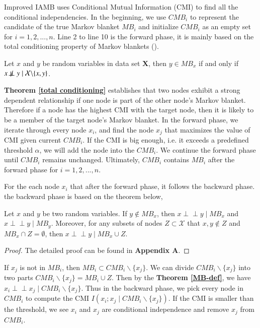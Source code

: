 \documentclass[twoside,11pt]{article}
\begin{document}
Improved IAMB uses Conditional Mutual Information (CMI) to find all the conditional independencies. In the beginning, we use $CMB_i$ to represent the candidate of the true Markov blanket $MB_i$ and initialize $CMB_i$ as an empty set for $i=1, 2, ..., n$. Line 2 to line 10 is the forward phase, it is mainly based on the total conditioning property of Markov blankets (\cite{pellet2008using}). 
\begin{theorem}
\label{total conditioning}
Let $x$ and $y$ be random variables in data set $\mathbf X$, then $y\in MB_x$ if and only if $x \not\! \perp \!\!\! \perp y\mid \mathcal X\backslash\{x,y\}$.
\end{theorem}
\textbf{Theorem \ref{total conditioning}} establishes that two nodes exhibit a strong dependent relationship if one node is part of the other node's Markov blanket. Therefore if a node has the highest CMI with the target node, then it is likely to be a member of the target node's Markov blanket. In the forward phase, we iterate through every node $x_i$, and find the node $x_j$ that maximizes the value of CMI given current $CMB_i$. If the CMI is big enough, i.e. it exceeds a predefined threshold $\alpha$, we will add the node into the $CMB_i$. We continue the forward phase until $CMB_i$ remains unchanged. Ultimately, $CMB_i$ contains $MB_i$ after the forward phase for $i=1, 2, ..., n$.

For the each node $x_i$ that after the forward phase, it follows the backward phase. the backward phase is based on the theorem below, 
\begin{theorem}
\label{MB-def}
Let $x$ and $y$ be two random variables. If $y\notin MB_x$, then $x\perp \!\!\! \perp y\mid MB_x$ and $x\perp \!\!\! \perp y\mid MB_y$. Moreover, for any subsets of nodes $Z\subset\mathcal X$ that $x,y\notin Z$ and $MB_x\cap Z=\emptyset$, then $x\perp\!\!\!\perp y\mid MB_x\cup Z$.
\end{theorem}
\begin{proof}
The detailed proof can be found in \textbf{Appendix A}.
\end{proof}

If $x_j$ is not in $MB_i$, then $MB_i\subset CMB_i\backslash\{x_j\}$. We can divide $CMB_i\backslash\{x_j\}$ into two parts $CMB_i\backslash\{x_j\}=MB_i\cup Z$. Then by the \textbf{Theorem \ref{MB-def}}, we have $x_i\perp\!\!\!\perp x_j\mid CMB_i\backslash\{x_j\}$. Thus in the backward phase, we pick every node in $CMB_i$ to compute the CMI $I(x_i; x_j\mid CMB_i\backslash\{x_j\})$. If the CMI is smaller than the threshold, we see $x_i$ and $x_j$ are conditional independence and remove $x_j$ from $CMB_i$.
\end{document}
